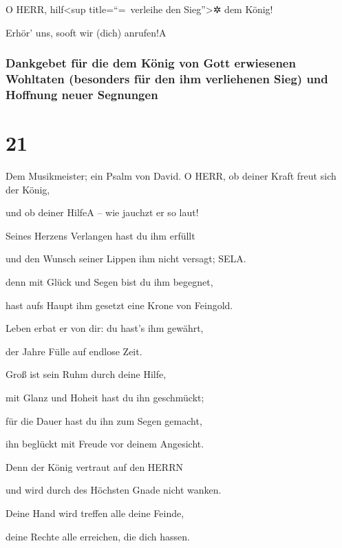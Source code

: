 O HERR, hilf\textless sup title=``=~verleihe den
Sieg''\textgreater✲ dem König!

Erhör' uns, sooft wir (dich) anrufen!{A}

\hypertarget{dankgebet-fuxfcr-die-dem-kuxf6nig-von-gott-erwiesenen-wohltaten-besonders-fuxfcr-den-ihm-verliehenen-sieg-und-hoffnung-neuer-segnungen}{%
\subsubsection{Dankgebet für die dem König von Gott erwiesenen Wohltaten
(besonders für den ihm verliehenen Sieg) und Hoffnung neuer
Segnungen}\label{dankgebet-fuxfcr-die-dem-kuxf6nig-von-gott-erwiesenen-wohltaten-besonders-fuxfcr-den-ihm-verliehenen-sieg-und-hoffnung-neuer-segnungen}}

\hypertarget{section-20}{%
\section{21}\label{section-20}}

Dem Musikmeister; ein Psalm von David. O
HERR, ob deiner Kraft freut sich der König,

und ob deiner Hilfe{A} -- wie jauchzt er so laut!

Seines Herzens Verlangen hast du ihm erfüllt

und den Wunsch seiner Lippen ihm nicht versagt; SELA.

denn mit Glück und Segen bist du ihm begegnet,

hast aufs Haupt ihm gesetzt eine Krone von Feingold.

Leben erbat er von dir: du hast's ihm gewährt,

der Jahre Fülle auf endlose Zeit.

Groß ist sein Ruhm durch deine Hilfe,

mit Glanz und Hoheit hast du ihn geschmückt;

für die Dauer hast du ihn zum Segen gemacht,

ihn beglückt mit Freude vor deinem Angesicht.

Denn der König vertraut auf den HERRN

und wird durch des Höchsten Gnade nicht wanken.

Deine Hand wird treffen alle deine Feinde,

deine Rechte alle erreichen, die dich hassen.

